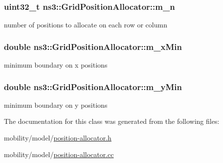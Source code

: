 \subsubsection[{\texorpdfstring{m\+\_\+n}{m_n}}]{\setlength{\rightskip}{0pt plus 5cm}uint32\+\_\+t ns3\+::\+Grid\+Position\+Allocator\+::m\+\_\+n\hspace{0.3cm}{\ttfamily [private]}}\hypertarget{classns3_1_1GridPositionAllocator_ae66a6e6c931f2444651650bedc9a1cc4}{}\label{classns3_1_1GridPositionAllocator_ae66a6e6c931f2444651650bedc9a1cc4}


number of positions to allocate on each row or column 

\subsubsection[{\texorpdfstring{m\+\_\+x\+Min}{m_xMin}}]{\setlength{\rightskip}{0pt plus 5cm}double ns3\+::\+Grid\+Position\+Allocator\+::m\+\_\+x\+Min\hspace{0.3cm}{\ttfamily [private]}}\hypertarget{classns3_1_1GridPositionAllocator_ad9c31c86707754e445ba7543537d693e}{}\label{classns3_1_1GridPositionAllocator_ad9c31c86707754e445ba7543537d693e}


minimum boundary on x positions 

\subsubsection[{\texorpdfstring{m\+\_\+y\+Min}{m_yMin}}]{\setlength{\rightskip}{0pt plus 5cm}double ns3\+::\+Grid\+Position\+Allocator\+::m\+\_\+y\+Min\hspace{0.3cm}{\ttfamily [private]}}\hypertarget{classns3_1_1GridPositionAllocator_a7f2c8a8cdd6799e48d77c90181fd6fe8}{}\label{classns3_1_1GridPositionAllocator_a7f2c8a8cdd6799e48d77c90181fd6fe8}


minimum boundary on y positions 



The documentation for this class was generated from the following files\+:\begin{DoxyCompactItemize}
\item 
mobility/model/\hyperlink{position-allocator_8h}{position-\/allocator.\+h}\item 
mobility/model/\hyperlink{position-allocator_8cc}{position-\/allocator.\+cc}\end{DoxyCompactItemize}
